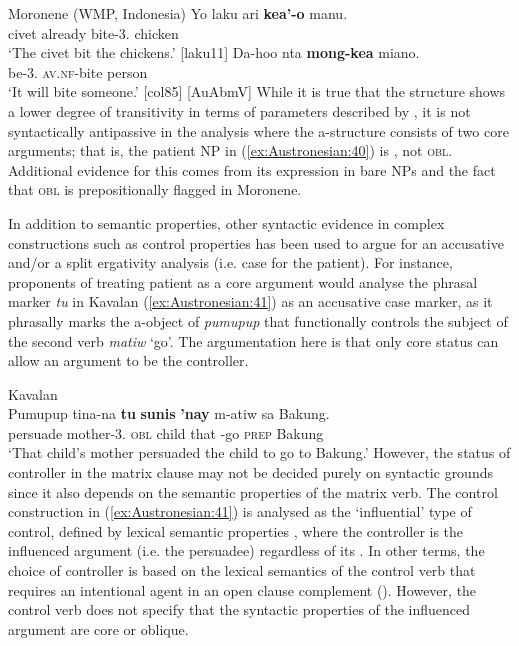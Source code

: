 \documentclass[output=paper,chinesefont]{../langscibook}
\begin{document}
\ea\label{ex:Austronesian:40} Moronene (WMP, Indonesia) \citep[246, 252]{Andersen2005}
\ea\gll
 Yo laku ari \textbf{kea'-o} manu.\\
  {\ART} civet already {bite-3\SG.\ABS} chicken\\
\glt `The civet bit the chickens.' [laku11]
\ex\gll
Da-hoo nta \textbf{mong-kea} miano.\\
be-3\SG.{\ABS} {\FUT} \textsc{av.nf}-bite person\\
\glt`It will bite someone.' [col85] [AuAbmV]
\z\z
While it is true that the \AV structure shows a lower degree of transitivity in terms of parameters described by \citet{Hopper1980}, it is not syntactically antipassive in the analysis where the a-structure consists of two core arguments; that is, the patient NP in (\ref{ex:Austronesian:40}) is \OBJ, not \textsc{obl}. Additional evidence for this comes from its expression in bare NPs and the fact that \textsc{obl} is prepositionally flagged in Moronene.

In addition to semantic properties, other syntactic evidence in complex constructions such as control properties has been used to argue for an accusative and/or a split ergativity analysis (i.e. \ACC case for the \AV patient). For instance, proponents of treating \AV patient as a core argument \citep{Hsin1996,Chang2000} would analyse the phrasal marker \emph{tu} in Kavalan (\ref{ex:Austronesian:41}) as an accusative case marker, as it phrasally marks the a-object of \emph{pumupup} that functionally controls the subject of the second verb \emph{matiw} `go'. The argumentation here is that only core status can allow an argument to be the controller.

\ea\label{ex:Austronesian:41} Kavalan  \citep[198]{Chang1997}\\
\gll
P{\textlangle}um{\textrangle}upup tina-na   \textbf{tu}  \textbf{sunis} \textbf{'nay} m-atiw sa Bakung.\\
\textlangle{\AV}{\textrangle}persuade mother-{3\SG.\GEN} \textsc{obl} child that \AV-go \textsc{prep} Bakung\\
\glt`That child's mother persuaded the child to go to Bakung.'
\z
However, the status of controller in the matrix clause may not be decided purely on syntactic grounds since it also depends on the semantic properties of the matrix verb. The control construction in (\ref{ex:Austronesian:41}) is analysed as the `influential' type of control, defined by lexical semantic properties \citep{SagPollard1991}, where the controller is the influenced argument (i.e. the persuadee) regardless of its \GF. In other terms, the choice of controller is based on the lexical semantics of the control verb that requires an intentional agent in an open clause complement (\XCOMP). However, the control verb does not specify that the syntactic properties of the influenced argument are core or oblique.
\end{document}
